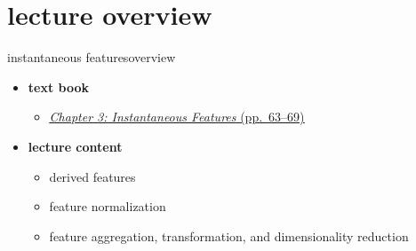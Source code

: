 

\subtitle{Part 4.3: Feature Post-Processing}


	

    \section[overview]{lecture overview}
        \begin{frame}{instantaneous features}{overview}
            \begin{itemize}
                \item   \textbf{text book}  
                    \begin{itemize}
                        \item   \href{http://ieeexplore.ieee.org/xpl/ebooks/bookPdfWithBanner.jsp?fileName=6331120.pdf&bkn=6266785&pdfType=chapter}{\underline{\textit{Chapter 3: Instantaneous Features} (pp.~63--69)}}
                    \end{itemize}
                \bigskip
                \item<2->   \textbf{lecture content}
                    \begin{itemize}
                        \item<2->   derived features
                        \item<3->   feature normalization
                        \item<4->   feature aggregation, transformation, and dimensionality reduction
                    \end{itemize}
            \end{itemize}
        \end{frame}

